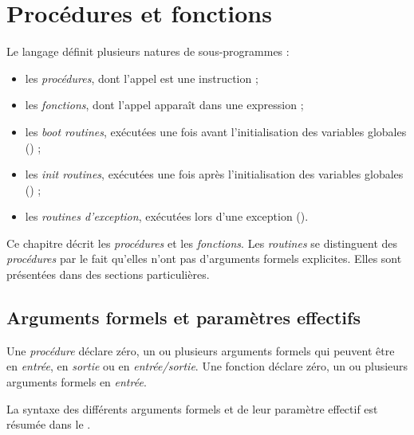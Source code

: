 




\chapter{Procédures et fonctions}

Le langage définit plusieurs natures de sous-programmes :
\begin{itemize}
  \item les \emph{procédures}, dont l'appel est une instruction ;
  \item les \emph{fonctions}, dont l'appel apparaît dans une expression ;
  \item les \emph{boot routines}, exécutées une fois avant l'initialisation des variables globales () ;
  \item les \emph{init routines}, exécutées une fois après l'initialisation des variables globales () ;
  \item les \emph{routines d'exception}, exécutées lors d'une exception ().
\end{itemize}

Ce chapitre décrit les \emph{procédures} et les \emph{fonctions}. Les \emph{routines} se distinguent des \emph{procédures} par le fait qu'elles n'ont pas d'arguments formels explicites. Elles sont présentées dans des sections particulières.

\section{Arguments formels et paramètres effectifs}


Une \emph{procédure} déclare zéro, un ou plusieurs arguments formels qui peuvent être en \emph{entrée}, en \emph{sortie} ou en \emph{entrée/sortie}. Une fonction déclare zéro, un ou plusieurs arguments formels en \emph{entrée}.

La syntaxe des différents arguments formels et de leur paramètre effectif est résumée dans le .


